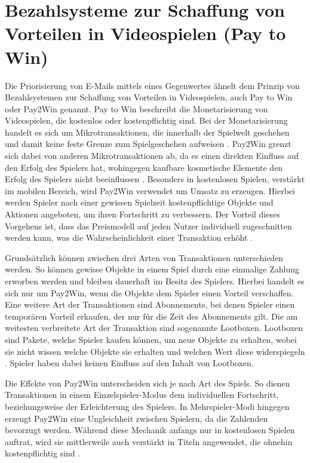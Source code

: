 
\section{Bezahlsysteme zur Schaffung von Vorteilen in Videospielen (Pay to Win)}
\label{Bezahlsysteme_zur_Schaffung_von_Vorteilen_in_Videospielen_(Pay_to_Win)}

Die Priorisierung von E-Mails mittels eines Gegenwertes ähnelt dem Prinzip von Bezahlsystemen zur Schaffung von Vorteilen in Videospielen, auch Pay to Win oder Pay2Win genannt. Pay to Win beschreibt die Monetarisierung von Videospielen, die kostenlos oder kostenpflichtig sind. Bei der Monetarisierung handelt es sich um Mikrotransaktionen, die innerhalb der Spielwelt geschehen und damit keine feste Grenze zum Spielgeschehen aufweisen \citep[S. 18]{Tomic2019}. Pay2Win grenzt sich dabei von anderen Mikrotransaktionen ab, da es einen direkten Einfluss auf den Erfolg des Spielers hat, wohingegen kaufbare kosmetische Elemente den Erfolg des Spielers nicht beeinflussen \citep[S. 124 f.]{Reza2019}. Besonders in kostenlosen Spielen, verstärkt im mobilen Bereich, wird Pay2Win verwendet um Umsatz zu erzeugen. Hierbei werden Spieler nach einer gewissen Spielzeit kostenpflichtige Objekte und Aktionen angeboten, um ihren Fortschritt zu verbessern. Der Vorteil dieses Vorgehens ist, dass das Preismodell auf jeden Nutzer individuell zugeschnitten werden kann, was die Wahrscheinlichkeit einer Transaktion erhöht \citep[S. 2]{Alha2014}.

Grundsätzlich können zwischen drei Arten von Transaktionen unterschieden werden. So können gewisse Objekte in einem Spiel durch eine einmalige Zahlung erworben werden und bleiben dauerhaft im Besitz des Spielers. Hierbei handelt es sich nur um Pay2Win, wenn die Objekte dem Spieler einen Vorteil verschaffen. Eine weitere Art der Transaktionen sind Abonnements, bei denen Spieler einen temporären Vorteil erkaufen, der nur für die Zeit des Abonnements gilt. Die am weitesten verbreitete Art der Transaktion sind sogenannte Lootboxen. Lootboxen sind Pakete, welche Spieler kaufen können, um neue Objekte zu erhalten, wobei sie nicht wissen welche Objekte sie erhalten und welchen Wert diese widerspiegeln \citep[S. 20]{Tomic2019}. Spieler haben dabei keinen Einfluss auf den Inhalt von Lootboxen.

Die Effekte von Pay2Win unterscheiden sich je nach Art des Spiels. So dienen Transaktionen in einem Einzelspieler-Modus dem individuellen Fortschritt, beziehungsweise der Erleichterung des Spielers. In Mehrspieler-Modi hingegen erzeugt Pay2Win eine Ungleichheit zwischen Spielern, da die Zahlenden bevorzugt werden. Während diese Mechanik anfangs nur in kostenlosen Spielen auftrat, wird sie mittlerweile auch verstärkt in Titeln angewendet, die ohnehin kostenpflichtig sind \citep[S. 19]{Tomic2019}.

